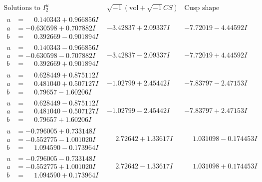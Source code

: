 \documentclass[1p]{elsarticle_modified}
\theoremstyle{definition}
\newcommand{\I}{\sqrt{-1}}
\begin{document}
$$\begin{array}{c|c|c}  
\text{Solutions to }I^u_{2}& \I (\text{vol} + \sqrt{-1}CS) & \text{Cusp shape}\\
 \hline 
\begin{aligned}
u &= \phantom{-}0.140343 + 0.966856 I \\
a &= -0.630598 + 0.707882 I \\
b &= \phantom{-}0.392669 - 0.901894 I\end{aligned}
 & -3.42837 + 2.09337 I & -7.72019 - 4.44592 I \\ \hline\begin{aligned}
u &= \phantom{-}0.140343 - 0.966856 I \\
a &= -0.630598 - 0.707882 I \\
b &= \phantom{-}0.392669 + 0.901894 I\end{aligned}
 & -3.42837 - 2.09337 I & -7.72019 + 4.44592 I \\ \hline\begin{aligned}
u &= \phantom{-}0.628449 + 0.875112 I \\
a &= \phantom{-}0.481040 + 0.507127 I \\
b &= \phantom{-}0.79657 - 1.60206 I\end{aligned}
 & -1.02799 + 2.45442 I & -7.83797 - 2.47153 I \\ \hline\begin{aligned}
u &= \phantom{-}0.628449 - 0.875112 I \\
a &= \phantom{-}0.481040 - 0.507127 I \\
b &= \phantom{-}0.79657 + 1.60206 I\end{aligned}
 & -1.02799 - 2.45442 I & -7.83797 + 2.47153 I \\ \hline\begin{aligned}
u &= -0.796005 + 0.733148 I \\
a &= -0.552775 - 1.001020 I \\
b &= \phantom{-}1.094590 - 0.173964 I\end{aligned}
 & \phantom{-}2.72642 + 1.33617 I & \phantom{-}1.031098 - 0.174453 I \\ \hline\begin{aligned}
u &= -0.796005 - 0.733148 I \\
a &= -0.552775 + 1.001020 I \\
b &= \phantom{-}1.094590 + 0.173964 I\end{aligned}
 & \phantom{-}2.72642 - 1.33617 I & \phantom{-}1.031098 + 0.174453 I \\ \hline\begin{aligned}

\end{aligned}
\end{array}$$
\end{document}
